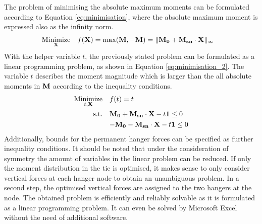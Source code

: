 \newpage
The problem of minimising the absolute maximum moments can be formulated according to Equation \eqref{eq:minimisation}, where the absolute maximum moment is expressed also as the infinity norm.
\begin{align}
    \underset{{\bf X}}{\text{Minimize}} \quad & f({\bf X}) = \max({\bf M}, -{\bf M}) = \|{\bf M_0} + {\bf M_{sn}} \cdot {\bf X}\|_{\infty} 
    \label{eq:minimisation}
\end{align}
With the helper variable $t$, the previously stated problem can be formulated as a linear programming problem, as shown in Equation \eqref{eq:minimisation_2}.
The variable $t$ describes the moment magnitude which is larger than the all absolute moments in ${\bf M}$ according to the inequality conditions.
\begin{align}
    \underset{t, {\bf X}}{\text{Minimize}} \quad & f(t) = t \label{eq:minimisation_2} \\
    \text{s.t.} \quad & {\bf M_0} + {\bf M_{sn}} \cdot {\bf X} - t {\bf 1} \leq  0 \nonumber \\
    \quad & {-\bf M_0} - {\bf M_{sn}} \cdot {\bf X} - t {\bf 1} \leq 0 \nonumber
\end{align}
Additionally, bounds for the permanent hanger forces can be specified as further inequality conditions. It should be noted that under the consideration of symmetry the amount of variables in the linear problem can be reduced. If only the moment distribution in the tie is optimised, it makes sense to only consider vertical forces at each hanger node to obtain an unambiguous problem. In a second step, the optimised vertical forces are assigned to the two hangers at the node. The obtained problem is efficiently and reliably solvable as it is formulated as a linear programming problem. It can even be solved by Microsoft Excel without the need of additional software.

